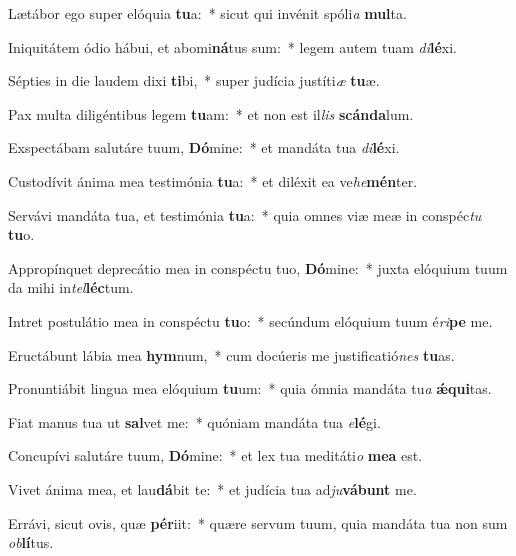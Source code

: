 \item Lætábor ego super elóquia \textbf{tu}a:~* sicut qui invénit spóli\textit{a} \textbf{mul}ta.
\item Iniquitátem ódio hábui, et abomi\textbf{ná}tus sum:~* legem autem tuam \textit{di}\textbf{lé}xi.
\item Sépties in die laudem dixi \textbf{ti}bi,~* super judícia justíti\textit{æ} \textbf{tu}æ.
\item Pax multa diligéntibus legem \textbf{tu}am:~* et non est il\textit{lis} \textbf{scán}\textbf{da}lum.
\item Exspectábam salutáre tuum, \textbf{Dó}mine:~* et mandáta tua \textit{di}\textbf{lé}xi.
\item Custodívit ánima mea testimónia \textbf{tu}a:~* et diléxit ea ve\textit{he}\textbf{mén}ter.
\item Servávi mandáta tua, et testimónia \textbf{tu}a:~* quia omnes viæ meæ in conspéc\textit{tu} \textbf{tu}o.
\item Appropínquet deprecátio mea in conspéctu tuo, \textbf{Dó}mine:~* juxta elóquium tuum da mihi in\textit{tel}\textbf{léc}tum.
\item Intret postulátio mea in conspéctu \textbf{tu}o:~* secúndum elóquium tuum é\textit{ri}\textbf{pe} me.
\item Eructábunt lábia mea \textbf{hym}num,~* cum docúeris me justificatió\textit{nes} \textbf{tu}as.
\item Pronuntiábit lingua mea elóquium \textbf{tu}um:~* quia ómnia mandáta tu\textit{a} \textbf{ǽ}\textbf{qui}tas.
\item Fiat manus tua ut \textbf{sal}vet me:~* quóniam mandáta tua \textit{e}\textbf{lé}gi.
\item Concupívi salutáre tuum, \textbf{Dó}mine:~* et lex tua meditáti\textit{o} \textbf{me}\textbf{a} est.
\item Vivet ánima mea, et lau\textbf{dá}bit te:~* et judícia tua ad\textit{ju}\textbf{vá}\textbf{bunt} me.
\item Errávi, sicut ovis, quæ \textbf{pér}iit:~* quære servum tuum, quia mandáta tua non sum \textit{ob}\textbf{lí}tus.

